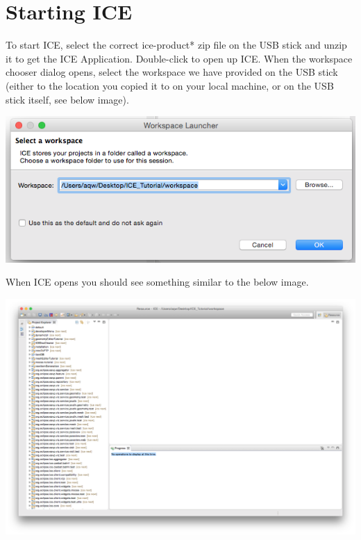 \section*{Starting ICE}
To start ICE, select the correct ice-product* zip file on the USB stick and
unzip it to get the ICE Application. Double-click to open up ICE. When the workspace chooser
dialog opens, select the workspace we have provided on the USB stick (either to
the location you copied it to on your local machine, or on the USB stick
itself, see below image). 
\begin{center} \includegraphics[width=\textwidth]{figures/workspace}
\end{center}
When ICE opens you should see something similar to the below image. 
\begin{center} \includegraphics[width=\textwidth]{figures/expectedICE}
\end{center} 

